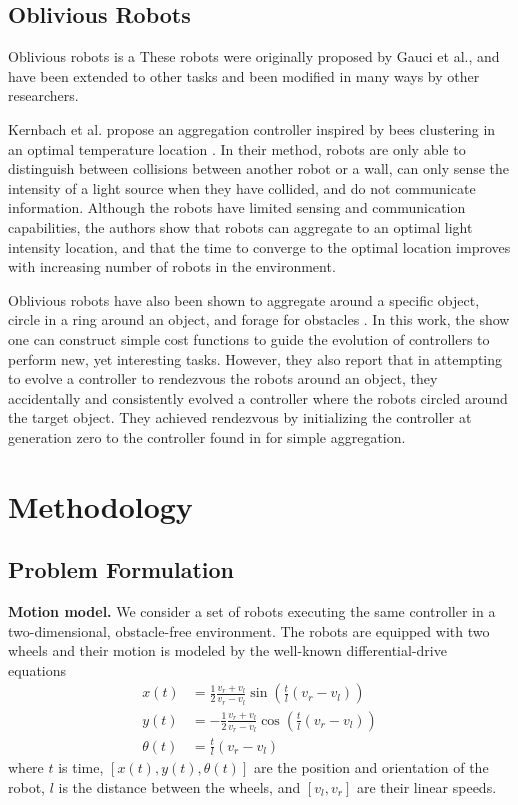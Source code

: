 \documentclass[conference]{IEEEtran}
\newcommand{\myparagraph}[1]{\textbf{#1.}}
\begin{document}
  \subsection{Oblivious Robots}

    Oblivious robots is a These robots were originally proposed by Gauci et al., and have been extended to other tasks and been modified in many ways by other researchers.

    Kernbach et al. propose an aggregation controller inspired by bees clustering in an optimal temperature location \cite{kernbach_re-embodiment_2009}. In their method, robots are only able to distinguish between collisions between another robot or a wall, can only sense the intensity of a light source when they have collided, and do not communicate information. Although the robots have limited sensing and communication capabilities, the authors show that robots can aggregate to an optimal light intensity location, and that the time to converge to the optimal location improves with increasing number of robots in the environment.

    Oblivious robots have also been shown to aggregate around a specific object, circle in a ring around an object, and forage for obstacles \cite{johnson_evolving_2016}. In this work, the show one can construct simple cost functions to guide the evolution of controllers to perform new, yet interesting tasks. However, they also report that in attempting to evolve a controller to rendezvous the robots around an object, they accidentally and consistently evolved a controller where the robots circled around the target object. They achieved rendezvous by initializing the controller at generation zero to the controller found in \cite{gauci_self-organized_2014} for simple aggregation.

\section{Methodology}

\subsection{Problem Formulation}

\myparagraph{Motion model}
We consider a set of robots executing the same controller in a two-dimensional,
obstacle-free environment. The robots are equipped with two wheels and their
motion is modeled by the well-known differential-drive
equations~\cite{Dudek2010}
\begin{equation}
  \label{eq:diffdrive}
  \begin{aligned}
    x(t)      &=  \frac{1}{2}\frac{v_r+v_l}{v_r-v_l}\sin\left(\frac{t}{l}(v_r-v_l)\right)\\
    y(t)      &= -\frac{1}{2}\frac{v_r+v_l}{v_r-v_l}\cos\left(\frac{t}{l}(v_r-v_l)\right)\\
    \theta(t) &=  \frac{t}{l}(v_r-v_l)
  \end{aligned}
\end{equation}
where $t$ is time, $[x(t),y(t),\theta(t)]$ are the position and orientation of
the robot, $l$ is the distance between the wheels, and $[v_l,v_r]$ are their
linear speeds.
\end{document}
